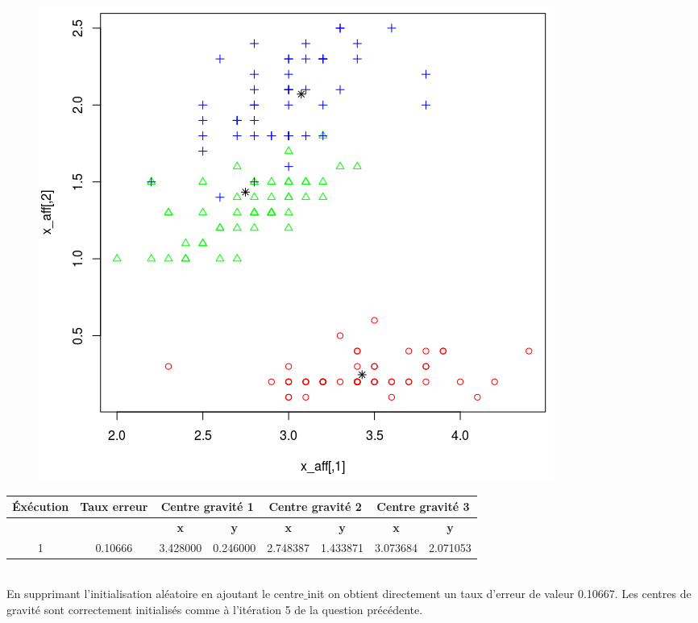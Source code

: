 \documentclass[a4paper,12pt]{report}
\begin{document}
\begin{figure}[!ht]
	\center
	\includegraphics[scale=0.3]{image/q1.png}
\end{figure}


\begin{tabular}{|c|c|c|c|c|c|c|c|}
   \hline
   \cellcolor{gray!40}\textbf{Éxécution} & \cellcolor{gray!40}\textbf{Taux erreur} & \multicolumn{2}{c}{\cellcolor{gray!40}\textbf{Centre gravité 1}} & \multicolumn{2}{c}{\cellcolor{gray!40}\textbf{Centre gravité 2}} & \multicolumn{2}{c}{\cellcolor{gray!40}\textbf{Centre gravité 3}} \\
   \hline
   \cellcolor{gray!40}\textbf{ } & \cellcolor{gray!40}\textbf{ } & 		\cellcolor{gray!40}\textbf{x}& 		\cellcolor{gray!40}\textbf{y}& 		\cellcolor{gray!40}\textbf{x}& 		\cellcolor{gray!40}\textbf{y}& 		\cellcolor{gray!40}\textbf{x}& 		\cellcolor{gray!40}\textbf{y} \\
   \hline
   1 & 0.10666 & 3.428000 & 0.246000 & 2.748387 & 1.433871 & 3.073684 & 2.071053 \\
   \hline
\end{tabular}\\

En supprimant l'initialisation aléatoire en ajoutant le centre$\_$init on obtient directement un taux d'erreur de valeur 0.10667. Les centres de gravité sont correctement initialisés comme à l'itération 5 de la question précédente.
\end{document}
